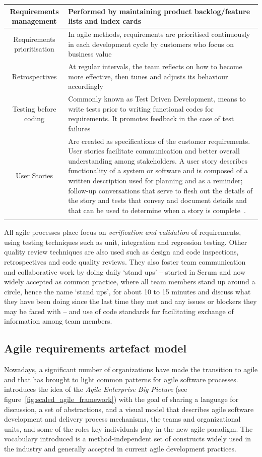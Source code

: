 \documentclass[dissertation,final]{softeng}
\begin{document}
{\begin{table}[h!]
{\begin{tabularx}{\textwidth}{cX}
Requirements management &  Performed by maintaining
product backlog/feature lists and index cards\\ \midrule
Requirements prioritisation & In agile methods, requirements are prioritised continuously in each development cycle by customers who focus on business value\\ \midrule
Retrospectives & At regular intervals, the team reflects on how to become more effective, then tunes and adjusts its behaviour accordingly~\footnotemark\\ \midrule
Testing before coding & Commonly known as Test Driven Development, means to write tests prior to writing functional codes for requirements. It promotes feedback in the case of test failures\\ \midrule
User Stories & Are created as specifications of the customer requirements. User stories facilitate communication and better overall understanding among stakeholders. A user story describes functionality of a system or software and is composed of a written description used for planning and as a reminder; follow-up conversations that serve to flesh out the details of the story and tests that convey and document details and that can be used to determine when a story is complete~\citep{cohn2004user}.\\
\addlinespace
\bottomrule
\end{tabularx}
}
\end{table}
}
All agile processes place focus on \emph{verification and validation} of requirements, using testing techniques such as unit, integration and regression testing. Other quality review techniques are also used such as design and code inspections, retrospectives and code quality reviews. They also foster team communication and collaborative work by doing daily `stand ups' -- started in Scrum and now widely accepted as common practice, where all team members stand up around a circle, hence the name `stand ups', for about 10 to 15 minutes and discuss what they have been doing since the last time they met and any issues or blockers they may be faced with -- and use of code standards for facilitating exchange of information among team members.

\subsection{Agile requirements artefact model}
Nowadays, a significant number of organizations have made the transition to agile and that has brought to light common patterns for agile software processes. ~\citet{Leffingwell2011} introduces the idea of the \emph{Agile Enterprise Big Picture} (see figure~\ref{fig:scaled_agile_framework}) with the goal of sharing a language for discussion, a set of abstractions, and a visual model that describes agile software development and delivery process mechanisms, the teams and organizational units, and some of the roles key individuals play in the new agile paradigm. The vocabulary introduced is a method-independent set of constructs widely used in the industry and generally accepted in current agile development practices.
\end{document}
